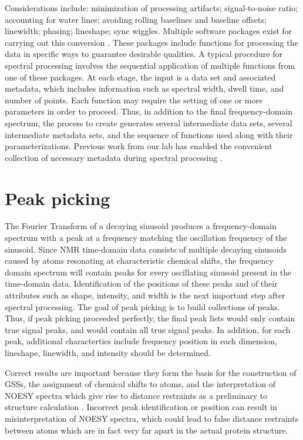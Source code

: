 Considerations include:  minimization of processing artifacts; signal-to-noise 
ratio; accounting for water lines; avoiding rolling baselines and baseline 
offsets; linewidth; phasing; lineshape; sync wiggles.  Multiple software 
packages exist for carrying out this conversion \cite{nmrpipe, rnmrtk}.
These packages include functions for processing the data in specific ways to 
guarantee desirable qualities.  A typical procedure for spectral processing 
involves the sequential application of multiple functions from one of these 
packages.  At each stage, the input is a data set and associated metadata, 
which includes information such as spectral width, dwell time, and number of 
points.  Each function may require the setting of one or more parameters in 
order to proceed.  Thus, in addition to the final frequency-domain spectrum, 
the process to create generates several intermediate data sets, several 
intermediate metadata sets, and the sequence of functions used along with 
their parameterizations.  Previous work from our lab has enabled the 
convenient collection of necessary metadata during spectral 
processing \cite{connjur-wb}.


\section{Peak picking}

The Fourier Transform of a decaying sinusoid produces a frequency-domain 
spectrum with a peak at a frequency matching the oscillation frequency of 
the sinusoid.  Since NMR time-domain data consists of multiple decaying 
sinusoids caused by atoms resonating at characteristic chemical shifts, 
the frequency domain spectrum will contain peaks for every oscillating 
sinusoid present in the time-domain data.  Identification of the positions 
of these peaks and of their attributes such as shape, intensity, and width 
is the next important step after spectral processing.  The goal of peak 
picking is to build collections of peaks.  Thus, if peak picking proceeded 
perfectly, the final peak lists would only contain true signal peaks, and 
would contain all true signal peaks.  
In addition, for each peak, additional charactertics include frequency 
position in each dimension, lineshape, linewidth, and intensity should be 
determined.

Correct results are important because they form the basis for the construction 
of GSSs, the assignment of chemical shifts to atoms, and the interpretation of 
NOESY spectra which give rise to distance restraints as a preliminary to 
structure calculation \cite{guerry2011automated}.  
Incorrect peak identification or position can result 
in misinterpretation of NOESY spectra, which could lead to false distance 
restraints between atoms which are in fact very far apart in the actual 
protein structure.
	
